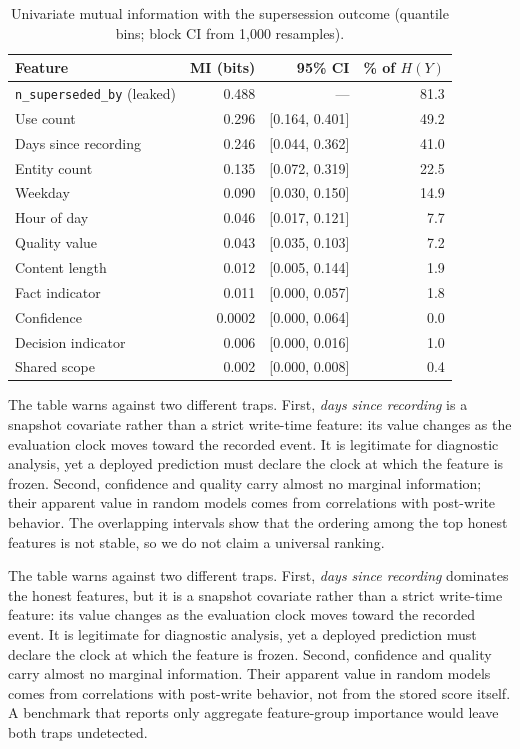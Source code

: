 \documentclass[sigconf,nonacm]{acmart}
\begin{document}
\begin{table}[h]
\centering
\caption{Univariate mutual information with the supersession outcome (quantile bins; block CI from 1,000 resamples).}
\label{tab:feature-mi}
\begin{tabular}{lrrr}
\toprule
Feature & MI (bits) & 95\% CI & \% of $H(Y)$ \\
\midrule
\texttt{n\_superseded\_by} (leaked) & 0.488 & --- & 81.3 \\
Use count & 0.296 & [0.164, 0.401] & 49.2 \\
Days since recording & 0.246 & [0.044, 0.362] & 41.0 \\
Entity count & 0.135 & [0.072, 0.319] & 22.5 \\
Weekday & 0.090 & [0.030, 0.150] & 14.9 \\
Hour of day & 0.046 & [0.017, 0.121] & 7.7 \\
Quality value & 0.043 & [0.035, 0.103] & 7.2 \\
Content length & 0.012 & [0.005, 0.144] & 1.9 \\
Fact indicator & 0.011 & [0.000, 0.057] & 1.8 \\
Confidence & 0.0002 & [0.000, 0.064] & 0.0 \\
Decision indicator & 0.006 & [0.000, 0.016] & 1.0 \\
Shared scope & 0.002 & [0.000, 0.008] & 0.4 \\
\bottomrule
\end{tabular}
\end{table}

The table warns against two different traps. First, \emph{days since recording} is a snapshot covariate rather than a strict write-time feature: its value changes as the evaluation clock moves toward the recorded event. It is legitimate for diagnostic analysis, yet a deployed prediction must declare the clock at which the feature is frozen. Second, confidence and quality carry almost no marginal information; their apparent value in random models comes from correlations with post-write behavior. The overlapping intervals show that the ordering among the top honest features is not stable, so we do not claim a universal ranking.

The table warns against two different traps. First, \emph{days since recording} dominates the honest features, but it is a snapshot covariate rather than a strict write-time feature: its value changes as the evaluation clock moves toward the recorded event. It is legitimate for diagnostic analysis, yet a deployed prediction must declare the clock at which the feature is frozen. Second, confidence and quality carry almost no marginal information. Their apparent value in random models comes from correlations with post-write behavior, not from the stored score itself. A benchmark that reports only aggregate feature-group importance would leave both traps undetected.
\end{document}
